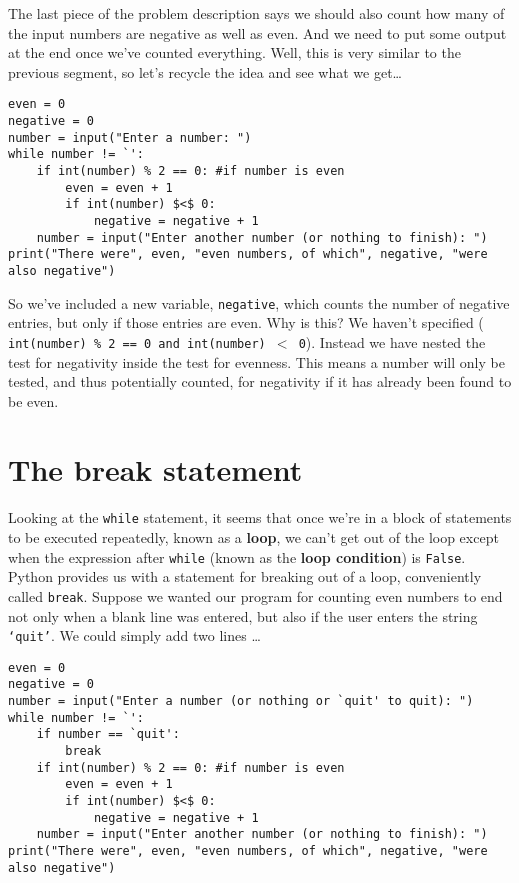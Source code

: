 The last piece of the problem description says we should also count   how many of the input numbers are negative as well as even. And we need   to put some output at the end once we've counted everything. Well, this   is very similar to the previous segment, so let's recycle the idea and   see what we get\ldots
\begin{lstlisting}
even = 0
negative = 0
number = input("Enter a number: ")
while number != `':
    if int(number) % 2 == 0: #if number is even
        even = even + 1
        if int(number) $<$ 0:
            negative = negative + 1
    number = input("Enter another number (or nothing to finish): ")
print("There were", even, "even numbers, of which", negative, "were also negative")
\end{lstlisting}

So we've included a new variable, \texttt{negative}, which counts the   number of negative entries, but only if those entries are even. Why is   this? We haven't specified (
\texttt{int(number) \% 2 == 0 and int(number)   $<$ 0}). Instead we have nested the test for negativity inside   the test for evenness. This means a number will only be tested, and   thus potentially counted, for negativity if it has already been found   to be even.

\section{The break statement}

Looking at the \texttt{while} statement, it seems that once we're in a block   of statements to be executed repeatedly, known as a   \textbf{loop}, we can't get out of the loop except when the   expression after \texttt{while} (known as the \textbf{loop condition}) is \texttt{False}.   Python provides us with a statement for breaking out of a loop,   conveniently called \texttt{break}. Suppose we   wanted our program for counting even numbers to end not only when a   blank line was entered, but also if the user enters the string \texttt{`quit'}.   We could simply add two lines \ldots
\begin{lstlisting}
even = 0
negative = 0
number = input("Enter a number (or nothing or `quit' to quit): ")
while number != `':
    if number == `quit':
        break
    if int(number) % 2 == 0: #if number is even
        even = even + 1
        if int(number) $<$ 0:
            negative = negative + 1
    number = input("Enter another number (or nothing to finish): ")
print("There were", even, "even numbers, of which", negative, "were also negative")
\end{lstlisting}

